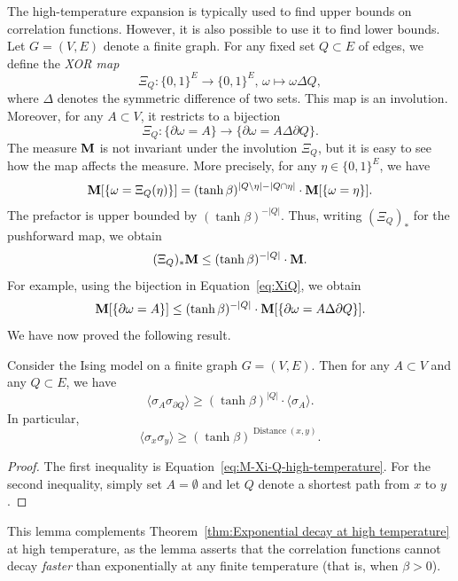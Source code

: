 The high-temperature expansion is typically used to find upper bounds on correlation
functions.
However, it is also possible to use it to find lower bounds.
Let $G=(V,E)$ denote a finite graph.
For any fixed set $Q\subset E$ of edges,
we define the \emph{XOR map}
\[
    \Xi_Q:\{0,1\}^E\to\{0,1\}^E,\,\omega\mapsto\omega\Delta Q,
\]
where $\Delta$ denotes the symmetric difference of two sets.
This map is an involution.
Moreover, for any $A\subset V$, it restricts to a bijection
\begin{equation}
    \label{eq:XiQ}
    \Xi_Q:
    \{\partial\omega=A\}\to\{\partial\omega=A\Delta\partial Q\}.
\end{equation}
The measure $\mathbf{M}$ is not invariant under the involution $\Xi_Q$,
but it is easy to see how the map affects the measure.
More precisely, for any $\eta\in\{0,1\}^E$, we have
\begin{equation}
    \label{eq:reweighting}
    \bfM[\{\omega = \Xi_Q(\eta)\}]
    =
    (\tanh\beta)^{|Q\setminus\eta|-|Q\cap\eta|}
    \cdot
    \bfM[\{\omega = \eta\}].
\end{equation}
The prefactor is upper bounded by $(\tanh\beta)^{-|Q|}$.
Thus, writing $(\Xi_Q)_*$ for the pushforward map,
we obtain
\[
    (\Xi_Q)_*\mathbf{M}\leq (\tanh\beta)^{-|Q|}
    \cdot
    \mathbf{M}.
\]
For example, using the bijection in Equation~\eqref{eq:XiQ},
we obtain
\begin{equation}
    \label{eq:M-Xi-Q-high-temperature}
    \bfM[\{\partial\omega=A\}]
    \leq
    (\tanh\beta)^{-|Q|}
    \cdot
    \bfM[\{\partial\omega=A\Delta\partial Q\}].
\end{equation}
We have now proved the following result.

\begin{lemma}
    \label{lemma:high-temperature}
    Consider the Ising model on a finite graph $G=(V,E)$.
    Then for any $A\subset V$ and any $Q\subset E$, we have
    \[
        \langle\sigma_A\sigma_{\partial Q}\rangle
        \geq
        (\tanh\beta)^{|Q|}\cdot\langle\sigma_A\rangle.
    \]
    In particular,
    \[
        \langle\sigma_x\sigma_y\rangle
        \geq
        (\tanh\beta)^{\operatorname{Distance}(x,y)}.
    \]
\end{lemma}

\begin{proof}
    The first inequality is Equation~\eqref{eq:M-Xi-Q-high-temperature}.
    For the second inequality, simply set $A=\emptyset$
    and let $Q$ denote a shortest path from $x$ to $y$.
\end{proof}

This lemma complements Theorem~\ref{thm:Exponential decay at high temperature}
at high temperature, as the lemma asserts that the correlation functions cannot
decay \emph{faster} than exponentially at any finite temperature
(that is, when $\beta>0$).
